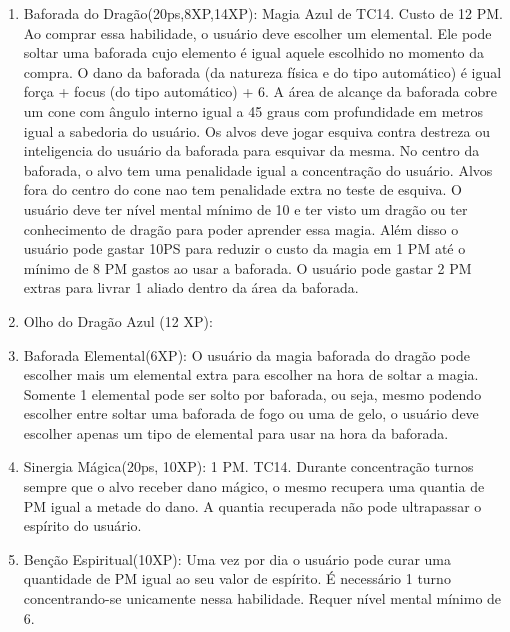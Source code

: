 \begin{enumerate}
	\item Baforada do Dragão(20ps,8XP,14XP): Magia Azul de TC14. Custo de 12 PM.\newline
	Ao comprar essa habilidade, o usuário deve escolher um elemental. Ele pode soltar uma baforada cujo elemento é igual aquele escolhido no momento da compra. O dano da baforada (da natureza física e do tipo automático) é igual força + focus (do tipo automático) + 6. A área de alcançe da baforada cobre um cone com ângulo interno igual a 45 graus com profundidade em metros igual a sabedoria do usuário. 
	Os alvos deve jogar esquiva contra destreza ou inteligencia do usuário da baforada para esquivar da mesma.
	No centro da baforada, o alvo tem uma penalidade igual a concentração do usuário. Alvos fora do centro do cone nao tem penalidade extra no teste de esquiva. 
	O usuário deve ter nível mental mínimo de 10 e ter visto um dragão ou ter conhecimento de dragão para poder aprender essa magia. Além disso o usuário pode gastar 10PS para reduzir o custo da magia em 1 PM até o mínimo de 8 PM gastos ao usar a baforada. O usuário pode gastar 2 PM extras para livrar 1 aliado dentro da área da baforada.
	
	\item Olho do Dragão Azul (12 XP): %
	
	\item Baforada Elemental(6XP): O usuário da magia baforada do dragão pode escolher mais um elemental extra para escolher na hora de soltar a magia. Somente 1 elemental pode ser solto por baforada, ou seja, mesmo podendo escolher entre soltar uma baforada de fogo ou uma de gelo, o usuário deve escolher apenas um tipo de elemental para usar na hora da baforada.

	\item Sinergia Mágica(20ps, 10XP): 1 PM. TC14. \newline
Durante concentração turnos sempre que o alvo receber dano mágico, o mesmo recupera uma quantia de PM igual a metade do dano. A quantia recuperada não pode ultrapassar o espírito do usuário.

	\item Benção Espiritual(10XP): Uma vez por dia o usuário pode curar uma quantidade de PM igual ao seu valor de espírito. É necessário 1 turno concentrando-se unicamente nessa habilidade. Requer nível mental mínimo de 6.


\end{enumerate}
